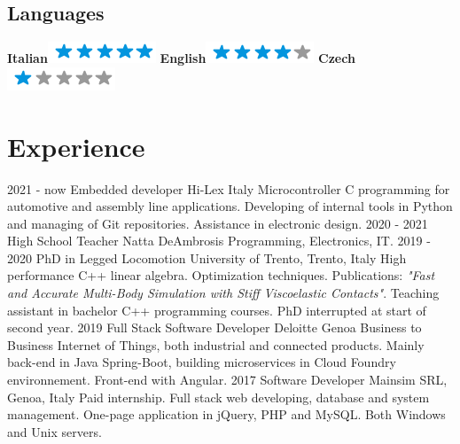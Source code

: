 \documentclass[]{friggeri-cv}
\begin{document}
\begin{aside}
  \section{Languages}
    \textbf{Italian}\includegraphics[scale=0.40]{img/5stars.png}
    \textbf{English}\includegraphics[scale=0.40]{img/4stars.png}
    \textbf{Czech}\includegraphics[scale=0.40]{img/1stars.png}    
\end{aside}

\section{Experience}
\begin{entrylist}
   \entry
    {2021 - now}
    {Embedded developer}
    {Hi-Lex Italy}
    {Microcontroller C programming for automotive and assembly line applications. Developing of internal tools in Python and managing of Git repositories. Assistance in electronic design.}
   \entry
	{2020 - 2021}
	{High School Teacher}
	{Natta DeAmbrosis}
	{Programming, Electronics, IT.}
  \entry
	{2019 - 2020}
	{PhD in Legged Locomotion}
	{University of Trento, Trento, Italy}
	{High performance C++ linear algebra. Optimization techniques. Publications: \textit{"Fast and Accurate Multi-Body Simulation with Stiff Viscoelastic Contacts"}. Teaching assistant in bachelor C++ programming courses. PhD interrupted at start of second year.}
  \entry
	{2019}
	{Full Stack Software Developer}
	{Deloitte Genoa}
	{Business to Business Internet of Things, both industrial and connected products. Mainly back-end in Java Spring-Boot, building microservices in Cloud Foundry environnement. Front-end with Angular. }
  \entry
    {2017}
    {Software Developer}
    {Mainsim SRL, Genoa, Italy}
    {Paid internship. Full stack web developing, database and system management. One-page application in jQuery, PHP and MySQL. Both Windows and Unix servers.}
\end{entrylist}
\end{document}
